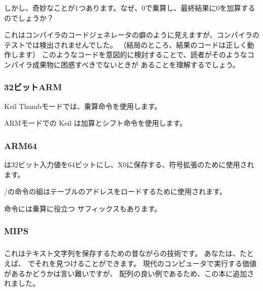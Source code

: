 


\myindex{\CompilerAnomaly}
\label{MSVC2013_anomaly}

しかし、奇妙なことが1つあります。なぜ、0で乗算し、最終結果に0を加算するのでしょうか？

これはコンパイラのコードジェネレータの癖のように見えますが、コンパイラのテストでは検出されませんでした。
（結局のところ、結果のコードは正しく動作します）
%
このようなコードを意図的に検討することで、読者がそのようなコンパイラ成果物に困惑すべきでないときが
あることを理解するでしょう。

\subsubsection{32ビットARM}

\Optimizing Keil 
Thumbモードでは、乗算命令を使用します。



ARMモードでの \Optimizing Keil は加算とシフト命令を使用します。



\subsubsection{ARM64}




は32ビット入力値を64ビットにし、X0に保存する、符号拡張のために使用されます。

\ADRP/\ADD の命令の組はテーブルのアドレスをロードするために使用されます。

\ADD 命令には乗算に役立つ \LSL サフィックスもあります。

\subsubsection{MIPS}


\subsubsection{\Conclusion{}}

これはテキスト文字列を保存するための昔ながらの技術です。
あなたは、たとえば、 \oracle でそれを見つけることができます。
現代のコンピュータで実行する価値があるかどうかは言い難いですが、
配列の良い例であるため、この本に追加されました。
